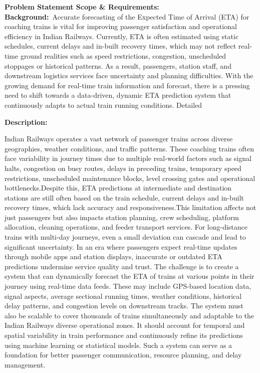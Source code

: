 \documentclass[10pt,a4paper]{article}
\begin{document}
\begin{tcolorbox}[pscard, title={"\textbf{SIH26028} \quad $\vert$ \quad Dynamic Forecast of Expected Time of Arrival (ETA) for Coaching Trains}]
\textbf{\color{sihnavy}Problem Statement Scope \& Requirements:}\\[0.15cm]
\vspace{0.18cm}\noindent\textbf{\color{sihnavy}Background:}~\small Accurate forecasting of the Expected Time of Arrival (ETA) for coaching trains is vital for improving passenger satisfaction and operational efficiency in Indian Railways. Currently, ETA is often estimated using static schedules, current delays and in-built recovery times, which may not reflect real-time ground realities such as speed restrictions, congestion, unscheduled stoppages or historical patterns. As a result, passengers, station staff, and downstream logistics services face uncertainty and planning difficulties. With the growing demand for real-time train information and forecast, there is a pressing need to shift towards a data-driven, dynamic ETA prediction system that continuously adapts to actual train running conditions. Detailed\par\vspace{0.06cm}
\vspace{0.18cm}\noindent\textbf{\color{sihnavy}Description:}\par\vspace{0.06cm}
\noindent\small Indian Railways operates a vast network of passenger trains across diverse geographies, weather conditions, and traffic patterns. These coaching trains often face variability in journey times due to multiple real-world factors such as signal halts, congestion on busy routes, delays in preceding trains, temporary speed restrictions, unscheduled maintenance blocks, level crossing gates and operational bottlenecks.Despite this, ETA predictions at intermediate and destination stations are still often based on the train schedule, current delays and in-built recovery times, which lack accuracy and responsiveness.This limitation affects not just passengers but also impacts station planning, crew scheduling, platform allocation, cleaning operations, and feeder transport services. For long-distance trains with multi-day journeys, even a small deviation can cascade and lead to significant uncertainty. In an era where passengers expect real-time updates through mobile apps and station displays, inaccurate or outdated ETA predictions undermine service quality and trust. The challenge is to create a system that can dynamically forecast the ETA of trains at various points in their journey using real-time data feeds. These may include GPS-based location data, signal aspects, average sectional running times, weather conditions, historical delay patterns, and congestion levels on downstream tracks. The system must also be scalable to cover thousands of trains simultaneously and adaptable to the Indian Railways diverse operational zones. It should account for temporal and spatial variability in train performance and continuously refine its predictions using machine learning or statistical models. Such a system can serve as a foundation for better passenger communication, resource planning, and delay management.\par\vspace{0.06cm}

\end{tcolorbox}
\end{document}
